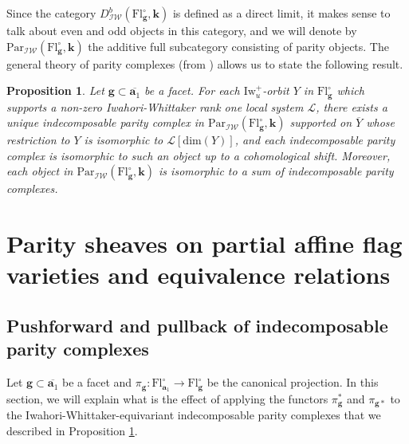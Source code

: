 \documentclass[11pt]{amsart}
\theoremstyle{plain}
\newtheorem{prop}[thm]{Proposition}
\theoremstyle{remark}
\numberwithin{equation}{section}
\begin{document}
	Since the category  $D^b_{\mathcal{IW}}(\mathrm{Fl}^{\circ}_{\mathbf{g}},\mathbf{k})$ is defined as a direct limit, it makes sense to talk about even and odd objects in this category, and we will denote by $\mathrm{Par}_{\mathcal{IW}}(\mathrm{Fl}^{\circ}_{\mathbf{g}},\mathbf{k})$ the additive full subcategory consisting of parity objects. The general theory of parity complexes (from \cite{2014}) allows us to state the following result.
	\begin{prop}\label{par prop}
		Let $\mathbf{g}\subset\overline{\mathbf{a}_1}$ be a facet. For each $\mathrm{Iw}_{u}^+$-orbit $Y$ in $\mathrm{Fl}^{\circ}_{\mathbf{g}}$ which supports a non-zero Iwahori-Whittaker rank one local system $\mathcal{L}$, there exists a unique  indecomposable parity complex in $\mathrm{Par}_{\mathcal{IW}}(\mathrm{Fl}^{\circ}_{\mathbf{g}},\mathbf{k})$ supported on $\overline{Y}$ whose restriction to $Y$ is isomorphic to $\mathcal{L}[\mathrm{dim}(Y)]$, and each indecomposable parity complex is isomorphic to such an object up to a cohomological shift. Moreover, each object in $\mathrm{Par}_{\mathcal{IW}}(\mathrm{Fl}^{\circ}_{\mathbf{g}},\mathbf{k})$ is isomorphic to a sum of indecomposable parity complexes.
	\end{prop}
	\section{Parity sheaves on partial affine flag varieties and equivalence relations} 
	\subsection{Pushforward and pullback of indecomposable parity complexes}\label{Pushforward and pullback of indecomposable parity complexes} Let $\mathbf{g}\subset\overline{\mathbf{a}_1}$ be a facet and $\pi_{\mathbf{g}}:\mathrm{Fl}^{\circ}_{\mathbf{a}_1}\to \mathrm{Fl}^{\circ}_{\mathbf{g}}$ be the canonical projection. In this section, we will explain what is the effect of applying the functors $\pi_\mathbf{g}^*$ and $\pi_{\mathbf{g} *}$ to the Iwahori-Whittaker-equivariant indecomposable parity complexes that we described in Proposition \ref{par prop}.
	
\end{document}

